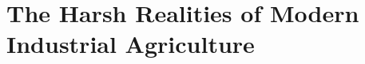 \section{The Harsh Realities of Modern Industrial Agriculture}
\begin{comment}
Current industrial agricultural practices jeopardize economic, ecological, and social sustainability and the long-term delivery of ecosystem goods and services. Economic sustainability, whether 'strong' or 'weak', relies on natural capital as the source for both primary and manufactured goods. Any substantial reduction in natural capital therefore reduces economic opportunity and potentially points to a decline in future human welfare \citep{pearce_blueprint_2000}. If the endowment of natural capital required for ecosystem goods and services is taken as the aggregate of functional terrestrial and aquatic ecosystems across the globe, then industrial agricultural reduces natural capital through loss of topsoil, creation of oceanic hypoxic zones, damage to hydrological systems, disruption of soil foodwebs, destruction of natural habitats across multiple scales, production of greenhouse gases, and loss of genetic diversity \citep{gliessman_agroecology:_2015}. Collectively these are externalized costs that result from (a) failure to properly value ecosystem goods and services, (b) failure to account for the true costs of environmental degradation and natural capital depletion, and (c) failure of markets and policies to provide incentives for sustainable stewardship of natural capital \citep{pearce_blueprint_2000}. 

\todo{provide additional discussion of environmental/ecological \\
externalities from industrial ag}
\begin{outline}[enumerate]
\1 Modern industrial agriculture negatively affects regional ecology and regional effects aggregate to disrupt global ecological functionalities.
\2 high algal blooms...
\2 Industrial ag is a primary source of anthropogenic inputs into natural biogeochemical cycles at the regional scale ... (the main inputs? the biogeochemical cycles of concern? the mechanisms and effects of inputs?)
\2 Industrial ag effects are aggregated to the global scale ... (mechanisms? examples?) 
\2 Regional inputs affect ecologies at a distance from source ... (mechanisms? examples?)
\2 The current state of worldwide ecosystem functionality is ... (examples? expectations?)
\end{outline}


\end{comment}
